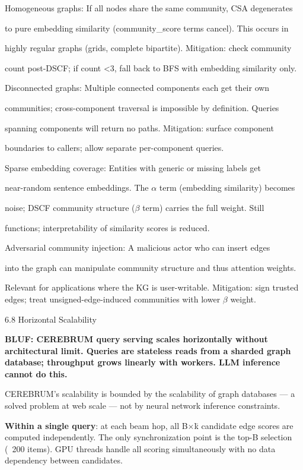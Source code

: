 \documentclass[10pt,journal,compsoc]{IEEEtran}
\begin{document}
Homogeneous graphs: If all nodes share the same community, CSA degenerates

to pure embedding similarity (community\_score terms cancel). This occurs in

highly regular graphs (grids, complete bipartite). Mitigation: check community

count post-DSCF; if count \textless  3, fall back to BFS with embedding similarity only.

Discon\-nected graphs: Multiple connected components each get their own

communities; cross-component traversal is impossible by definition. Queries

spanning components will return no paths. Mitigation: surface component

boundaries to callers; allow separate per-component queries.

Sparse embedding coverage: Entities with generic or missing labels get

near-random sentence embeddings. The $\alpha$ term (embedding similarity) becomes

noise; DSCF community structure ($\beta$ term) carries the full weight. Still

functions; inter\-pretability of similarity scores is reduced.

Adversarial community injection: A malicious actor who can insert edges

into the graph can manipulate community structure and thus attention weights.

Relevant for appli\-cations where the KG is user-writable. Mitigation: sign trusted edges; treat unsigned-edge-induced communities with lower $\beta$ weight.

6.8 Horizontal Scalability

\textbf{BLUF: CEREBRUM query serving scales horiz\-ontally without archi\-tectural limit. Queries are stateless reads from a sharded graph database; throughput grows linearly with workers. LLM inference cannot do this.}

CEREBRUM's scalability is bounded by the scalability of graph databases — a solved problem at web scale — not by neural network inference constraints.

\textbf{Within a single query}: at each beam hop, all B$\times$k̄ candidate edge scores are computed indep\-endently. The only synch\-ronization point is the top-B selection (~200 items). GPU threads handle all scoring simul\-taneously with no data dependency between candidates.
\end{document}
